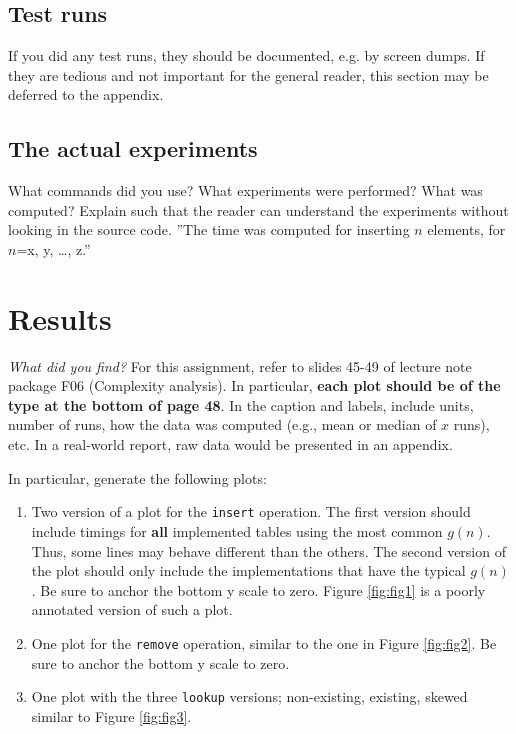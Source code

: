 \documentclass[10pt, titlepage, oneside, a4paper]{article}
\begin{document}
\subsection{Test runs}
\label{sec:testruns}
If you did any test runs, they should be documented, e.g. by screen
dumps. If they are tedious and not important for the general reader,
this section may be deferred to the appendix.

\subsection{The actual experiments}
\label{sec:experiments_detail}
What commands did you use? What experiments were performed? What was
computed? Explain such that the reader can understand the experiments
without looking in the source code. ''The time was computed for
inserting \(n\) elements, for \(n\)=x, y, \ldots{}, z.''

\section{Results}
\label{sec:results}
\emph{What did you find?} For this assignment, refer to slides 45-49 of
lecture note package F06 (Complexity analysis). In particular, \textbf{each
plot should be of the type at the bottom of page 48}. In the caption
and labels, include units, number of runs, how the data was computed
(e.g., mean or median of \(x\) runs), etc. In a real-world report, raw
data would be presented in an appendix.

In particular, generate the following plots:
\begin{enumerate}
\item Two version of a plot for the \texttt{insert} operation. The first version
should include timings for \textbf{all} implemented tables using the most
common \(g(n)\). Thus, some lines may behave different than the
others.  The second version of the plot should only include the
implementations that have the typical \(g(n)\). Be sure to anchor the
bottom y scale to zero.  Figure \ref{fig:fig1} is a poorly
annotated version of such a plot.
\item One plot for the \texttt{remove} operation, similar to the one in Figure
\ref{fig:fig2}. Be sure to anchor the bottom y scale to zero.
\item One plot with the three \texttt{lookup} versions; non-existing, existing, 
skewed similar to Figure \ref{fig:fig3}.
\end{enumerate}
\end{document}
